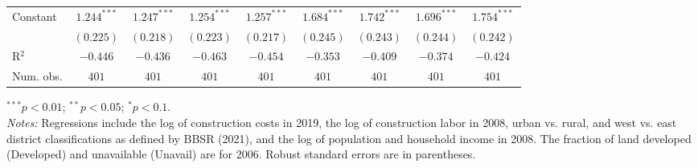 \begin{table}
\begin{center}
\begin{footnotesize}
\begin{threeparttable}
\begin{tabular}{l@{} c@{} c@{} c@{} c@{} c@{} c@{} c@{} c@{}}
Constant                              & $1.244^{***}$ & $1.247^{***}$ & $1.254^{***}$ & $1.257^{***}$ & $1.684^{***}$ & $1.742^{***}$ & $1.696^{***}$ & $1.754^{***}$ \\
                                      & $(0.225)$     & $(0.218)$     & $(0.223)$     & $(0.217)$     & $(0.245)$     & $(0.243)$     & $(0.244)$     & $(0.242)$     \\
\midrule
R$^2$                                 & $-0.446$      & $-0.436$      & $-0.463$      & $-0.454$      & $-0.353$      & $-0.409$      & $-0.374$      & $-0.424$      \\
Num. obs.                             & $401$         & $401$         & $401$         & $401$         & $401$         & $401$         & $401$         & $401$         \\
\bottomrule
\end{tabular}
\begin{tablenotes}[flushleft]
\tiny{\item $^{***}p<0.01$; $^{**}p<0.05$; $^{*}p<0.1$. \\ \textit{Notes:} Regressions include the log of construction costs in 2019, the log of construction labor in 2008, urban vs. rural, and west vs. east district classifications as defined by BBSR (2021), and the log of population and household income in 2008. The fraction of land developed (Developed) and unavailable (Unavail) are for 2006. Robust standard errors are in parentheses.}
\end{tablenotes}
\end{threeparttable}
\end{footnotesize}
\label{tbl-iv-results-single-family-checked}
\end{center}
\end{table}

